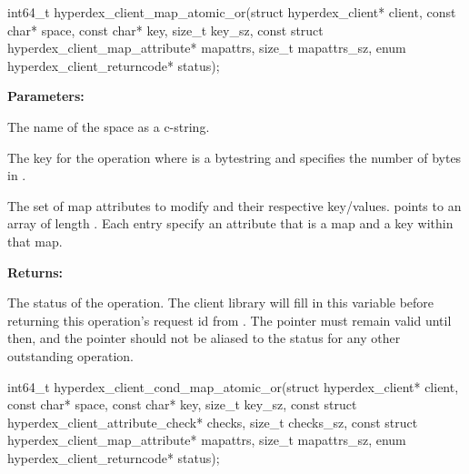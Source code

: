 \funcsep
{}
\begin{ccode}
int64_t hyperdex_client_map_atomic_or(struct hyperdex_client* client,
                const char* space,
                const char* key, size_t key_sz,
                const struct hyperdex_client_map_attribute* mapattrs, size_t mapattrs_sz,
                enum hyperdex_client_returncode* status);
\end{ccode}
\funcdesc 

\noindent\textbf{Parameters:}
\begin{description}[labelindent=\widthof{{\code{mapattrs}, \code{mapattrs\_sz}}},leftmargin=*,noitemsep,nolistsep,align=right]
\item[\code{space}] The name of the space as a c-string.
\item[\code{key}, \code{key\_sz}] The key for the operation where  is a bytestring and  specifies the number of bytes in .
\item[\code{mapattrs}, \code{mapattrs\_sz}] The set of map attributes to modify and their respective key/values.   points to an array of length .  Each entry specify an attribute that is a map and a key within that map.
\end{description}

\noindent\textbf{Returns:}
\begin{description}[labelindent=\widthof{{\code{status}}},leftmargin=*,noitemsep,nolistsep,align=right]
\item[\code{status}] The status of the operation.  The client library will fill in this variable before returning this operation's request id from .  The pointer must remain valid until then, and the pointer should not be aliased to the status for any other outstanding operation.
\end{description}

\funcsep
{}
\begin{ccode}
int64_t hyperdex_client_cond_map_atomic_or(struct hyperdex_client* client,
                const char* space,
                const char* key, size_t key_sz,
                const struct hyperdex_client_attribute_check* checks, size_t checks_sz,
                const struct hyperdex_client_map_attribute* mapattrs, size_t mapattrs_sz,
                enum hyperdex_client_returncode* status);
\end{ccode}
\funcdesc 

